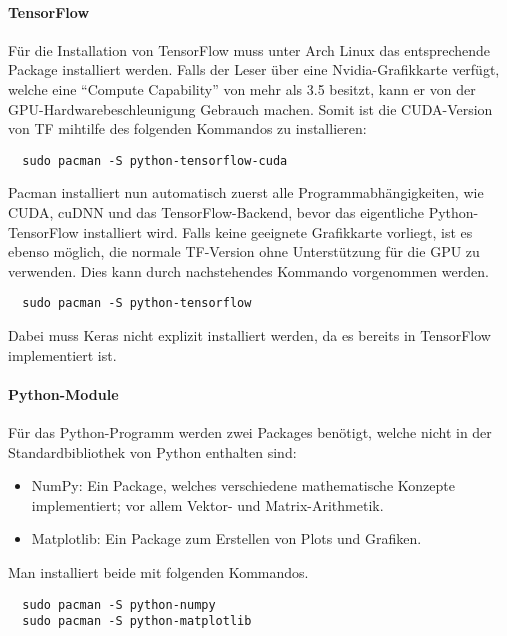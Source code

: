 \paragraph{TensorFlow}
Für die Installation von TensorFlow muss unter Arch Linux das entsprechende
Package installiert werden.
Falls der Leser über eine Nvidia-Grafikkarte verfügt, welche eine ``Compute
Capability'' von mehr als 3.5 besitzt, kann er von der
GPU-Hardwarebeschleunigung Gebrauch machen.
Somit ist die CUDA-Version von TF mihtilfe des folgenden Kommandos zu installieren:
\begin{verbatim}
  sudo pacman -S python-tensorflow-cuda
\end{verbatim}
Pacman installiert nun automatisch zuerst alle Programmabhängigkeiten, wie
CUDA, cuDNN und das TensorFlow-Backend, bevor das eigentliche
Python-TensorFlow installiert wird.
\para{}
Falls keine geeignete Grafikkarte vorliegt, ist es ebenso möglich, die normale
TF-Version ohne Unterstützung für die GPU zu verwenden.
Dies kann durch nachstehendes Kommando vorgenommen werden.
\begin{verbatim}
  sudo pacman -S python-tensorflow
\end{verbatim}
\para{}
Dabei muss Keras nicht explizit installiert werden, da es bereits in TensorFlow implementiert ist.

\paragraph{Python-Module}

Für das Python-Programm werden zwei Packages benötigt, welche
nicht in der Standardbibliothek von Python enthalten sind:
\begin{itemize}
\item{NumPy: Ein Package, welches verschiedene mathematische Konzepte
    implementiert; vor allem Vektor- und Matrix-Arithmetik.}
\item{Matplotlib: Ein Package zum Erstellen von Plots und Grafiken.}
\end{itemize}

Man installiert beide mit folgenden Kommandos.
\begin{verbatim}
  sudo pacman -S python-numpy
  sudo pacman -S python-matplotlib
\end{verbatim}

